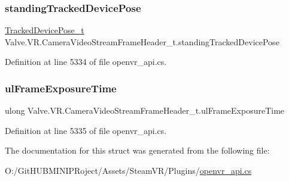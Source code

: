 \subsubsection{\texorpdfstring{standingTrackedDevicePose}{standingTrackedDevicePose}}
{\footnotesize\ttfamily \mbox{\hyperlink{struct_valve_1_1_v_r_1_1_tracked_device_pose__t}{Tracked\+Device\+Pose\+\_\+t}} Valve.\+V\+R.\+Camera\+Video\+Stream\+Frame\+Header\+\_\+t.\+standing\+Tracked\+Device\+Pose}



Definition at line 5334 of file openvr\+\_\+api.\+cs.

\mbox{\label{struct_valve_1_1_v_r_1_1_camera_video_stream_frame_header__t_a574f21f28247d150e80df30c757d9946}} 
\subsubsection{\texorpdfstring{ulFrameExposureTime}{ulFrameExposureTime}}
{\footnotesize\ttfamily ulong Valve.\+V\+R.\+Camera\+Video\+Stream\+Frame\+Header\+\_\+t.\+ul\+Frame\+Exposure\+Time}



Definition at line 5335 of file openvr\+\_\+api.\+cs.



The documentation for this struct was generated from the following file\+:\begin{DoxyCompactItemize}
\item 
O\+:/\+Git\+H\+U\+B\+M\+I\+N\+I\+P\+Roject/\+Assets/\+Steam\+V\+R/\+Plugins/\mbox{\hyperlink{openvr__api_8cs}{openvr\+\_\+api.\+cs}}\end{DoxyCompactItemize}
